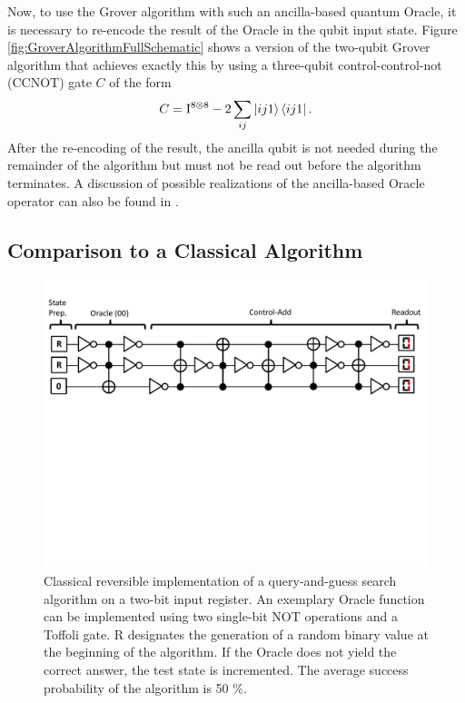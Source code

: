 \smallskip

Now, to use the Grover algorithm with such an ancilla-based quantum Oracle, it is necessary to re-encode the result of the Oracle in the qubit input state. Figure \ref{fig:GroverAlgorithmFullSchematic} shows a version of the two-qubit Grover algorithm that achieves exactly this by using a three-qubit control-control-not (CCNOT) gate $C$ of the form
%
\begin{equation}
C = \mathrm{I}^{8\otimes 8}-2\sum\limits_{ij} \left| ij1 \right>\left< ij1 \right|.
\end{equation}
%
After the re-encoding of the result, the ancilla qubit is not needed during the remainder of the algorithm but must not be read out before the algorithm terminates. A discussion of possible realizations of the ancilla-based Oracle operator can also be found in \citep{mermin_quantum_2007}.

\subsection{Comparison to a Classical Algorithm}

\begin{figure}[ht!]
	\centering
		\includegraphics[width=1.0\textwidth]{"./material/papers/grover/classical_reversible_algorithm"}
	\caption{Classical reversible implementation of a query-and-guess search algorithm on a two-bit input register. An exemplary Oracle function can be implemented using two single-bit NOT operations and a Toffoli gate. R designates the generation of a random binary value at the beginning of the algorithm. If the Oracle does not yield the correct answer, the test state is incremented. The average success probability of the algorithm is 50 \%.}
	\label{fig:GroverClassicalReversibleAlgorithm}
\end{figure}

